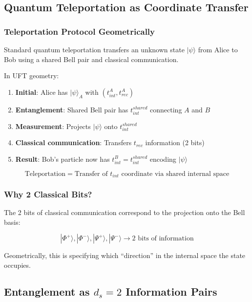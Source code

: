 \subsection{Quantum Teleportation as Coordinate Transfer}

\subsubsection{Teleportation Protocol Geometrically}

Standard quantum teleportation transfers an unknown state $|\psi\rangle$ from Alice to Bob using a shared Bell pair and classical communication.

In UFT geometry:

\begin{enumerate}
    \item \textbf{Initial}: Alice has $|\psi\rangle_A$ with $(t_{int}^A, t_{rec}^A)$
    \item \textbf{Entanglement}: Shared Bell pair has $t_{int}^{shared}$ connecting $A$ and $B$
    \item \textbf{Measurement}: Projects $|\psi\rangle$ onto $t_{int}^{shared}$
    \item \textbf{Classical communication}: Transfers $t_{rec}$ information (2 bits)
    \item \textbf{Result}: Bob's particle now has $t_{int}^B = t_{int}^{shared}$ encoding $|\psi\rangle$
\end{enumerate}

\begin{equation}
    \text{Teleportation} = \text{Transfer of } t_{int} \text{ coordinate via shared internal space}
\end{equation}

\subsubsection{Why 2 Classical Bits?}

The 2 bits of classical communication correspond to the projection onto the Bell basis:

\begin{equation}
    |\Phi^+\rangle, |\Phi^-\rangle, |\Psi^+\rangle, |\Psi^-\rangle \rightarrow \text{2 bits of information}
\end{equation}

Geometrically, this is specifying which ``direction'' in the internal space the state occupies.

\subsection{Entanglement as $d_s = 2$ Information Pairs}

